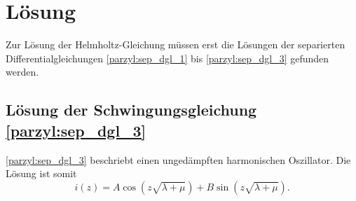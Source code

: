 %
%
%
\section{Lösung
\label{parzyl:section:teil1}}
Zur Lösung der Helmholtz-Gleichung müssen erst die Lösungen der separierten
Differentialgleichungen \eqref{parzyl:sep_dgl_1} bis \eqref{parzyl:sep_dgl_3}
gefunden werden.
\subsection{Lösung der Schwingungsgleichung \eqref{parzyl:sep_dgl_3}}
\eqref{parzyl:sep_dgl_3} beschriebt einen ungedämpften harmonischen Oszillator.
Die Lösung ist somit
\begin{equation}
	i(z) 
	= 
	A\cos{ 
		\left ( z
		\sqrt{\lambda + \mu}
		\right )}
	+
	B\sin{ 
		\left ( z
		\sqrt{\lambda + \mu}
		\right )}.
\end{equation}
